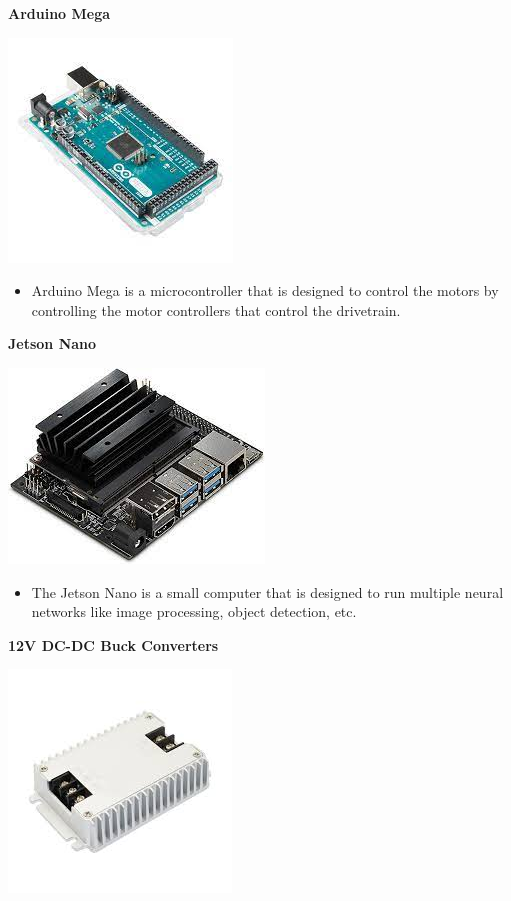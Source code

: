 \documentclass[a4paper, 10pt]{article}
\begin{document}
\textbf{Arduino Mega}

\includegraphics[scale=0.5]{Arduino Mega}

\begin{itemize}
\item
	Arduino Mega is a microcontroller that is designed to control the motors by controlling the motor controllers that control the drivetrain.
\end{itemize}


\textbf{Jetson Nano}

\includegraphics[scale=0.5]{Jetson Nano}

\begin{itemize}
\item
	The Jetson Nano is a small computer that is designed to run multiple neural networks like image processing, object detection, etc. 
\end{itemize}


\textbf{12V DC-DC Buck Converters}

\includegraphics[scale=0.5]{12V DC-DC buck converter}
\end{document}
